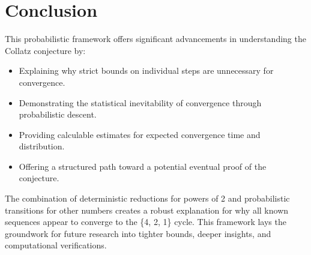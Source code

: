 \section{Conclusion}
This probabilistic framework offers significant advancements in understanding the Collatz conjecture by:
\begin{itemize}
    \item Explaining why strict bounds on individual steps are unnecessary for convergence.
    \item Demonstrating the statistical inevitability of convergence through probabilistic descent.
    \item Providing calculable estimates for expected convergence time and distribution.
    \item Offering a structured path toward a potential eventual proof of the conjecture.
\end{itemize}

The combination of deterministic reductions for powers of 2 and probabilistic transitions for other numbers creates a robust explanation for why all known sequences appear to converge to the \{4, 2, 1\} cycle. This framework lays the groundwork for future research into tighter bounds, deeper insights, and computational verifications.
